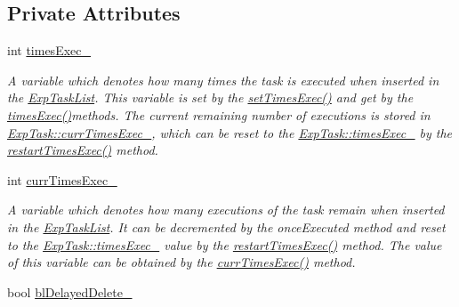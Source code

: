 \subsection*{Private Attributes}
\begin{DoxyCompactItemize}
\item 
\hypertarget{class_exp_task_af38ca6f3252632f98e496758349477ac}{}int \hyperlink{class_exp_task_af38ca6f3252632f98e496758349477ac}{times\+Exec\+\_\+}\label{class_exp_task_af38ca6f3252632f98e496758349477ac}

\begin{DoxyCompactList}\small\item\em A variable which denotes how many times the task is executed when inserted in the \hyperlink{class_exp_task_list}{Exp\+Task\+List}. This variable is set by the \hyperlink{class_exp_task_a9de0c990109370dea83ca471a05e1772}{set\+Times\+Exec()} and get by the \hyperlink{class_exp_task_acdb19df2cfecd5c7f7d28141b062a6fe}{times\+Exec()}methods. The current remaining number of executions is stored in \hyperlink{class_exp_task_a56421ba6834b53d845c1c6d14ede077f}{Exp\+Task\+::curr\+Times\+Exec\+\_\+}, which can be reset to the \hyperlink{class_exp_task_af38ca6f3252632f98e496758349477ac}{Exp\+Task\+::times\+Exec\+\_\+} by the \hyperlink{class_exp_task_ac84290f4ee014237657794522350cfea}{restart\+Times\+Exec()} method. \end{DoxyCompactList}\item 
\hypertarget{class_exp_task_a56421ba6834b53d845c1c6d14ede077f}{}int \hyperlink{class_exp_task_a56421ba6834b53d845c1c6d14ede077f}{curr\+Times\+Exec\+\_\+}\label{class_exp_task_a56421ba6834b53d845c1c6d14ede077f}

\begin{DoxyCompactList}\small\item\em A variable which denotes how many executions of the task remain when inserted in the \hyperlink{class_exp_task_list}{Exp\+Task\+List}. It can be decremented by the once\+Executed method and reset to the \hyperlink{class_exp_task_af38ca6f3252632f98e496758349477ac}{Exp\+Task\+::times\+Exec\+\_\+} value by the \hyperlink{class_exp_task_ac84290f4ee014237657794522350cfea}{restart\+Times\+Exec()} method. The value of this variable can be obtained by the \hyperlink{class_exp_task_a1ab988b6d9eb6d61cd1b3ac1a1c42153}{curr\+Times\+Exec()} method. \end{DoxyCompactList}\item 
\hypertarget{class_exp_task_a9771cd4fb35fe809474e68810f66759c}{}bool \hyperlink{class_exp_task_a9771cd4fb35fe809474e68810f66759c}{bl\+Delayed\+Delete\+\_\+}\label{class_exp_task_a9771cd4fb35fe809474e68810f66759c}


\end{DoxyCompactItemize}
